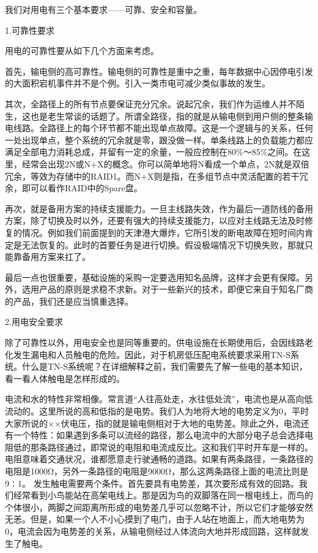 \documentclass[12pt,UTF8]{ctexbook}
\begin{document}
我们对用电有三个基本要求——可靠、安全和容量。

1.可靠性要求

用电的可靠性要从如下几个方面来考虑。

首先，输电侧的高可靠性。输电侧的可靠性是重中之重，每年数据中心因停电引发的大面积宕机事件并不是个例。引入一类市电可减少类似事故的发生。

其次，全路径上的所有节点要保证充分冗余。说起冗余，我们作为运维人并不陌生，这也是老生常谈的话题了。所谓全路径，指的就是从输电侧到用户侧的整条输电线路。全路径上的每个环节都不能出现单点故障。这是一个逻辑与的关系，任何一处出现单点，整个系统的冗余就是零，跟没做一样。单条线路上的负载能力都应满足全部电力消耗总成，并留有一定的余量，一般应控制在80\%～85\%之间。在这里，经常会出现2N或N+X的概念。你可以简单地将N看成一个单点，2N就是双倍冗余，等效为存储中的RAID1。而N+X则是指，在多组节点中灵活配置的若干冗余，即可以看作RAID中的Spare盘。

再次，就是备用方案的持续支援能力。一旦主线路失效，作为最后一道防线的备用方案，除了切换及时以外，还要有强大的持续支援能力，以应对主线路无法及时修复的情况。例如我们前面提到的天津港大爆炸，它所引发的断电故障在短时间内肯定是无法恢复的。此时的首要任务是进行切换。假设极端情况下切换失败，那就只能靠备用方案来扛了。

最后一点也很重要，基础设施的采购一定要选用知名品牌，这样才会更有保障。另外，选用产品的原则是求稳不求新。对于一些新兴的技术，即便它来自于知名厂商的产品，我们还是应当慎重选择。

2.用电安全要求

除了可靠性以外，用电安全也是同等重要的。供电设施在长期使用后，会因线路老化发生漏电和人员触电的危险。因此，对于机房低压配电系统要求采用TN-S系统。什么是TN-S系统呢？在详细解释之前，我们需要先了解一些电的基本知识，看一看人体触电是怎样形成的。

电流和水的特性非常相像。常言道“人往高处走，水往低处流”，电流也是从高向低流动的。这里所说的高和低指的是电势。我们人为地将大地的电势定义为0，平时大家所说的××伏电压，指的就是输电侧相对于大地的电势差。除此之外，电流还有一个特性：如果遇到多条可以流经的路径，那么电流中的大部分电子总会选择电阻低的那条路径通过，即常说的电阻和电流成反比。这和我们平时开车是一样的。电阻意味着交通状况，谁都愿意走行驶通畅的道路。如果有两条路径，一条路径的电阻是1000Ω，另外一条路径的电阻是9000Ω，那么这两条路径上面的电流比则是9∶1。
发生触电需要两个条件。首先要具有电势差，其次要形成有效的回路。我们经常看到小鸟能站在高架电线上。那是因为鸟的双脚落在同一根电线上，而鸟的个体很小，两脚之间距离所形成的电势差几乎可以忽略不计，所以它们才能够安然无恙。但是，如果一个人不小心摸到了电门，由于人站在地面上，而大地电势为0，电流会因为电势差的关系，从输电侧经过人体流向大地并形成回路，这样就发生了触电。
\end{document}
